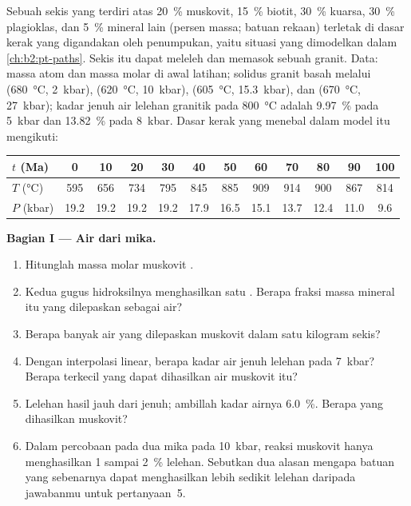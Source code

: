 \begin{problem}\label{pb:b2:crustal-melting:1}
Sebuah sekis yang terdiri atas \qty{20}{\percent} muskovit, \qty{15}{\percent} biotit,
\qty{30}{\percent} kuarsa, \qty{30}{\percent} plagioklas, dan \qty{5}{\percent} mineral
lain (persen massa; batuan rekaan) terletak di dasar kerak yang digandakan oleh penumpukan, yaitu
situasi yang dimodelkan dalam \cref{ch:b2:pt-paths}. Sekis itu dapat meleleh dan memasok sebuah  granit. Data:
massa atom dan massa molar di awal latihan; solidus granit basah melalui
(\qty{680}{\celsius}, \qty{2}{kbar}), (\qty{620}{\celsius}, \qty{10}{kbar}),
(\qty{605}{\celsius}, \qty{15.3}{kbar}), dan (\qty{670}{\celsius}, \qty{27}{kbar}); kadar
jenuh air lelehan granitik pada \qty{800}{\celsius} adalah \qty{9.97}{\percent} pada
\qty{5}{kbar} dan \qty{13.82}{\percent} pada \qty{8}{kbar}. Dasar kerak yang menebal dalam model itu mengikuti:

\smallskip
\begin{center}\small
\begin{tabular}{l|ccccccccccc}
$t$ (\unit{Ma}) & 0 & 10 & 20 & 30 & 40 & 50 & 60 & 70 & 80 & 90 & 100\\ \hline
$T$ (\unit{\celsius}) & 595 & 656 & 734 & 795 & 845 & 885 & 909 & 914 & 900 & 867 & 814\\
$P$ (\unit{kbar}) & 19.2 & 19.2 & 19.2 & 19.2 & 17.9 & 16.5 & 15.1 & 13.7 & 12.4 & 11.0 & 9.6
\end{tabular}
\end{center}
\smallskip

\noindent\textbf{Bagian I --- Air dari mika.}
\begin{enumerate}
\item Hitunglah massa molar muskovit .
\item Kedua gugus hidroksilnya menghasilkan satu . Berapa fraksi massa mineral itu yang
dilepaskan sebagai air?
\item Berapa banyak air yang dilepaskan muskovit dalam satu kilogram sekis?
\item Dengan interpolasi linear, berapa kadar air jenuh lelehan pada
\qty{7}{kbar}? Berapa  terkecil yang dapat dihasilkan air muskovit itu?
\item Lelehan hasil  jauh dari jenuh; ambillah kadar airnya
\qty{6.0}{\percent}. Berapa  yang dihasilkan muskovit?
\item Dalam percobaan pada  dua mika pada \qty{10}{kbar}, reaksi muskovit
hanya menghasilkan 1 sampai \qty{2}{\percent} lelehan. Sebutkan dua alasan mengapa batuan yang sebenarnya dapat menghasilkan lebih sedikit
lelehan daripada jawabanmu untuk pertanyaan~5.
\end{enumerate}


\end{problem}
